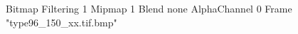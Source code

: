 {Bitmap
	{Filtering 1}
	{Mipmap 1}
	{Blend none}
	{AlphaChannel 0}
	{Frame "type96_150_xx.tif.bmp"}
}
